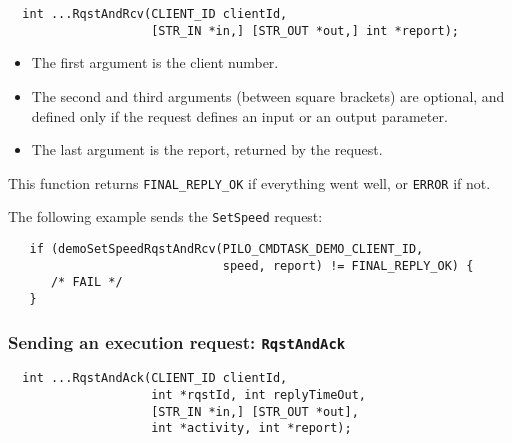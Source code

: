 \begin{center}\begin{cartouche}\small\begin{verbatim}
  int ...RqstAndRcv(CLIENT_ID clientId,
                    [STR_IN *in,] [STR_OUT *out,] int *report);
\end{verbatim}\end{cartouche}\end{center}

\begin{itemize}
\item The first argument is the client number. 

\item The second and third arguments (between square brackets) are
optional, and defined only if the request defines an input or an output
parameter.

\item The last argument is the report, returned by the request.
\end{itemize}

This function returns {\tt FINAL\_REPLY\_OK}  if everything went well, or
{\tt ERROR} if not.

\bigbreak

The following example sends the {\tt SetSpeed} request:

\begin{center}\begin{cartouche}\small\begin{verbatim}
   if (demoSetSpeedRqstAndRcv(PILO_CMDTASK_DEMO_CLIENT_ID, 
                              speed, report) != FINAL_REPLY_OK) {
      /* FAIL */
   }
\end{verbatim}\end{cartouche}\end{center}


\subsubsection{Sending an execution request: {\tt RqstAndAck}}

\begin{center}\begin{cartouche}\small\begin{verbatim}
  int ...RqstAndAck(CLIENT_ID clientId,
                    int *rqstId, int replyTimeOut,
                    [STR_IN *in,] [STR_OUT *out],
                    int *activity, int *report);
\end{verbatim}\end{cartouche}\end{center}

